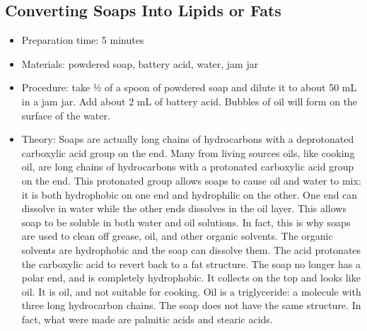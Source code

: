 \subsection{Converting Soaps Into Lipids or Fats}
\begin{itemize}
\item{Preparation time: 5 minutes}
\item{Materials: powdered soap, battery acid, water, jam jar}
\item{Procedure: take ½ of a spoon of powdered soap and dilute it to about 50 mL in a jam jar. Add about 2 mL of battery acid. Bubbles of oil will form on the surface of the water. }
\item{Theory: Soaps are actually long chains of hydrocarbons with a deprotonated carboxylic acid group on the end. Many from living sources oils, like cooking oil, are long chains of hydrocarbons with a protonated carboxylic acid group on the end. This protonated group allows soaps to cause oil and water to mix: it is both hydrophobic on one end and hydrophilic on the other. One end can dissolve in water while the other ends dissolves in the oil layer. This allows soap to be soluble in both water and oil solutions. In fact, this is why soaps are used to clean off grease, oil, and other organic solvents. The organic solvents are hydrophobic and the soap can dissolve them. The acid protonates the carboxylic acid to revert back to a fat structure. The soap no longer has a polar end, and is completely hydrophobic. It collects on the top and looks like oil. It is oil, and not suitable for cooking. Oil is a triglyceride: a molecule with three long hydrocarbon chains. The soap does not have the same structure. In fact, what were made are palmitic acids and stearic acids. }
\end{itemize}

